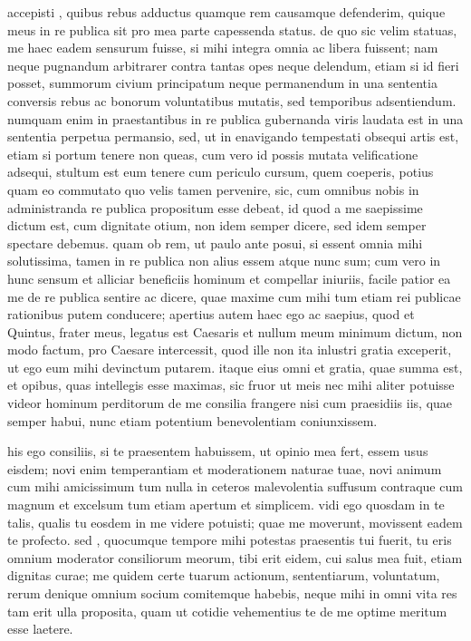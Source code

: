  accepisti , quibus rebus adductus quamque rem causamque defenderim, quique meus in re publica sit pro mea parte capessenda status. de quo sic velim statuas, me haec eadem sensurum fuisse, si mihi integra omnia ac libera fuissent; nam neque pugnandum arbitrarer contra tantas opes neque delendum, etiam si id fieri posset, summorum civium principatum neque permanendum in una sententia conversis rebus ac bonorum voluntatibus mutatis, sed temporibus adsentiendum. numquam enim in praestantibus in re publica gubernanda viris laudata est in una sententia perpetua permansio, sed, ut in enavigando tempestati obsequi artis est, etiam si portum tenere non queas, cum vero id possis mutata velificatione adsequi, stultum est eum tenere cum periculo cursum, quem coeperis, potius quam eo commutato quo velis tamen pervenire, sic, cum omnibus nobis in administranda re publica propositum esse debeat, id quod a me saepissime dictum est, cum dignitate otium, non idem semper dicere, sed idem semper spectare debemus. quam ob rem, ut paulo ante posui, si essent omnia mihi solutissima, tamen in re publica non alius essem atque nunc sum; cum vero in hunc sensum et alliciar beneficiis hominum et compellar iniuriis, facile patior ea me de re publica sentire ac dicere, quae maxime cum mihi tum etiam rei publicae rationibus putem conducere; apertius autem haec ego ac saepius, quod et Quintus, frater meus, legatus est Caesaris et nullum meum minimum dictum, non modo factum, pro Caesare intercessit, quod ille non ita inlustri gratia exceperit, ut ego eum mihi devinctum putarem. itaque eius omni et gratia, quae summa est, et opibus, quas intellegis esse maximas, sic fruor ut meis nec mihi aliter potuisse videor hominum perditorum de me consilia frangere nisi cum praesidiis iis, quae semper habui, nunc etiam potentium benevolentiam coniunxissem.

 his ego consiliis, si te praesentem habuissem, ut opinio mea fert, essem usus eisdem; novi enim temperantiam et moderationem naturae tuae, novi animum cum mihi amicissimum tum nulla in ceteros malevolentia suffusum contraque cum magnum et excelsum tum etiam apertum et simplicem. vidi ego quosdam in te talis, qualis tu eosdem in me videre potuisti; quae me moverunt, movissent eadem te profecto. sed , quocumque tempore mihi potestas praesentis tui fuerit, tu eris omnium moderator consiliorum meorum, tibi erit eidem, cui salus mea fuit, etiam dignitas curae; me quidem certe tuarum actionum, sententiarum, voluntatum, rerum denique omnium socium comitemque habebis, neque mihi in omni vita res tam erit ulla proposita, quam ut cotidie vehementius te de me optime meritum esse laetere.

